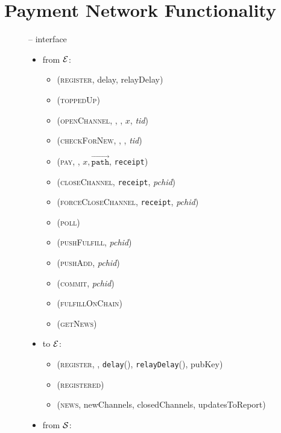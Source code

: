\section{Payment Network Functionality}
  \label{appendix:payfunc}
  \begin{figure}[H]
    \begin{systembox}{\fpaynet{} -- interface}
      \begin{itemize}
        \item from $\mathcal{E}$:
        \begin{itemize}
          \item (\textsc{register}, delay, relayDelay)
          \item (\textsc{toppedUp})
          \item (\textsc{openChannel}, \alice, \bob, $x$, \textit{tid})
          \item (\textsc{checkForNew}, \alice, \bob, \textit{tid})
          \item (\textsc{pay}, \bob, $x, \overrightarrow{\mathtt{path}}$,
          \texttt{receipt})
          \item (\textsc{closeChannel}, \texttt{receipt}, \textit{pchid})
          \item (\textsc{forceCloseChannel}, \texttt{receipt}, \textit{pchid})
          \item (\textsc{poll})
          \item (\textsc{pushFulfill}, \textit{pchid})
          \item (\textsc{pushAdd}, \textit{pchid})
          \item (\textsc{commit}, \textit{pchid})
          \item (\textsc{fulfillOnChain})
          \item (\textsc{getNews})
        \end{itemize}
        \item to $\mathcal{E}$:
        \begin{itemize}
          \item (\textsc{register}, \alice, \texttt{delay}(\alice),
          \texttt{relayDelay}(\alice), pubKey)
          \item (\textsc{registered})
          \item (\textsc{news}, newChannels, closedChannels, updatesToReport)
        \end{itemize}
        \item from $\mathcal{S}$:
        \begin{itemize}

\end{itemize}
\end{itemize}
\end{systembox}
\end{figure}
